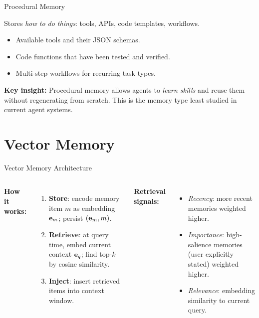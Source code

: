 \documentclass[aspectratio=169,10pt]{beamer}
\begin{document}
\begin{frame}{Procedural Memory}
  \begin{tcolorbox}[hitbox, title=Procedural Memory = Skills and Workflows]
    Stores \emph{how to do things}: tools, APIs, code templates, workflows.
    \begin{itemize}
      \item Available tools and their JSON schemas.
      \item Code functions that have been tested and verified.
      \item Multi-step workflows for recurring task types.
    \end{itemize}
  \end{tcolorbox}
  \vspace{0.4em}
  \textbf{Key insight:} Procedural memory allows agents to \emph{learn skills} and reuse them
  without regenerating from scratch. This is the memory type least studied in current agent systems.
\end{frame}

\section{Vector Memory}

\begin{frame}{Vector Memory Architecture}
  \begin{columns}[T]
      \textbf{How it works:}
      \begin{enumerate}
        \item \textbf{Store}: encode memory item $m$ as embedding $\mathbf{e}_m$; persist $(\mathbf{e}_m, m)$.
        \item \textbf{Retrieve}: at query time, embed current context $\mathbf{e}_q$; find top-$k$ by cosine similarity.
        \item \textbf{Inject}: insert retrieved items into context window.
      \end{enumerate}
      \vspace{0.4em}
      \textbf{Retrieval signals:}
      \begin{itemize}
        \item \emph{Recency}: more recent memories weighted higher.
        \item \emph{Importance}: high-salience memories (user explicitly stated) weighted higher.
        \item \emph{Relevance}: embedding similarity to current query.
      \end{itemize}
  \end{columns}
\end{frame}
\end{document}
